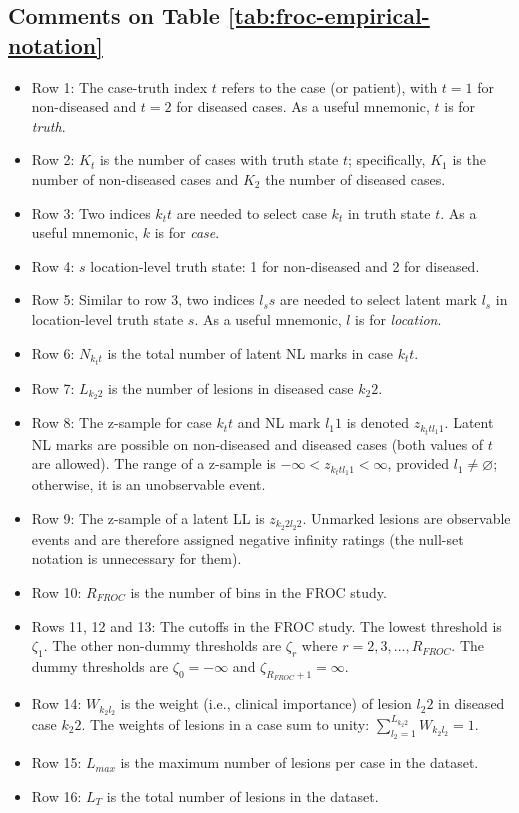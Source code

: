 \documentclass[
]{book}
\begin{document}
\hypertarget{comments-on-table-reftabfroc-empirical-notation}{%
\subsection{Comments on Table \ref{tab:froc-empirical-notation}}\label{comments-on-table-reftabfroc-empirical-notation}}

\begin{itemize}
\item
  Row 1: The case-truth index \(t\) refers to the case (or patient), with \(t = 1\) for non-diseased and \(t = 2\) for diseased cases. As a useful mnemonic, \(t\) is for \emph{truth}.
\item
  Row 2: \(K_t\) is the number of cases with truth state \(t\); specifically, \(K_1\) is the number of non-diseased cases and \(K_2\) the number of diseased cases.
\item
  Row 3: Two indices \(k_t t\) are needed to select case \(k_t\) in truth state \(t\). As a useful mnemonic, \(k\) is for \emph{case}.
\item
  Row 4: \(s\) location-level truth state: 1 for non-diseased and 2 for diseased.
\item
  Row 5: Similar to row 3, two indices \(l_s s\) are needed to select latent mark \(l_s\) in location-level truth state \(s\). As a useful mnemonic, \(l\) is for \emph{location}.
\item
  Row 6: \(N_{k_t t}\) is the total number of latent NL marks in case \(k_t t\).
\item
  Row 7: \(L_{k_2 2}\) is the number of lesions in diseased case \(k_2 2\).
\item
  Row 8: The z-sample for case \(k_t t\) and NL mark \(l_1 1\) is denoted \(z_{k_t t l_1 1}\). Latent NL marks are possible on non-diseased and diseased cases (both values of \(t\) are allowed). The range of a z-sample is \(-\infty < z_{k_t t l_1 1} < \infty\), provided \(l_1 \neq \varnothing\); otherwise, it is an unobservable event.
\item
  Row 9: The z-sample of a latent LL is \(z_{k_2 2 l_2 2}\). Unmarked lesions are observable events and are therefore assigned negative infinity ratings (the null-set notation is unnecessary for them).
\item
  Row 10: \(R_{FROC}\) is the number of bins in the FROC study.
\item
  Rows 11, 12 and 13: The cutoffs in the FROC study. The lowest threshold is \(\zeta_1\). The other non-dummy thresholds are \(\zeta_r\) where \(r=2,3,...,R_{FROC}\). The dummy thresholds are \(\zeta_0 = -\infty\) and \(\zeta_{R_{FROC}+1} = \infty\).
\item
  Row 14: \(W_{k_2 l_2}\) is the weight (i.e., clinical importance) of lesion \(l_2 2\) in diseased case \(k_2 2\). The weights of lesions in a case sum to unity: \(\sum_{l_2 = 1}^{L_{k_2 2}}W_{k_2 l_2} = 1\).
\item
  Row 15: \(L_{max}\) is the maximum number of lesions per case in the dataset.
\item
  Row 16: \(L_T\) is the total number of lesions in the dataset.
\end{itemize}
\end{document}
